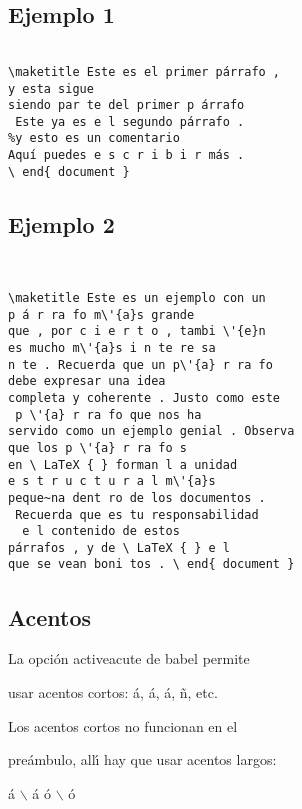 \subsection{Ejemplo 1}
\begin{verbatim}

\maketitle Este es el primer párrafo ,
y esta sigue
siendo par te del primer p árrafo
 Este ya es e l segundo párrafo .
%y esto es un comentario
Aquí puedes e s c r i b i r más .
\ end{ document }

\end{verbatim}

\subsection{Ejemplo 2}
\begin{verbatim}


\maketitle Este es un ejemplo con un
p á r ra fo m\'{a}s grande
que , por c i e r t o , tambi \'{e}n
es mucho m\'{a}s i n te re sa
n te . Recuerda que un p\'{a} r ra fo
debe expresar una idea
completa y coherente . Justo como este
 p \'{a} r ra fo que nos ha
servido como un ejemplo genial . Observa
que los p \'{a} r ra fo s
en \ LaTeX { } forman l a unidad
e s t r u c t u r a l m\'{a}s
peque~na dent ro de los documentos .
 Recuerda que es tu responsabilidad
  e l contenido de estos
párrafos , y de \ LaTeX { } e l
que se vean boni tos . \ end{ document }
\end{verbatim}

\subsection{Acentos}

La opci\'{o}n activeacute de babel permite

usar acentos cortos: \'{a}, \'{a}, \'{a}, \~{n}, etc.

Los acentos cortos no funcionan en el

pre\'{a}mbulo, all\'{\i} hay que usar acentos largos:

\'{a}
$\backslash$%
\'a \'{o}
$\backslash$%
\'o

